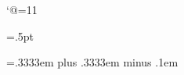 %
%
%

\catcode`@=11                                   %

\newdimen\colwidth                              %
\newdimen\pagewidth                             %
\newdimen\pageheight                            %
\newdimen{}          {}=.5pt          %
\newdimen\colmaxdepth     \colmaxdepth=4pt      %
                                                
\newdimen\@bigColHeight         %
\newdimen\@saveSplitmax         %
\newdimen\@saveVsize            %
\newskip\s@veskip               %
\newskip\doublecolskip          %
\doublecolskip=.3333em plus .3333em minus .1em  %

\newdimen\@leftpluscenter       %

\newbox\partialpage             %

\newif\ifleftc@lumn             %
\newif\if@wid                   %
\newif\if@bot                   %

